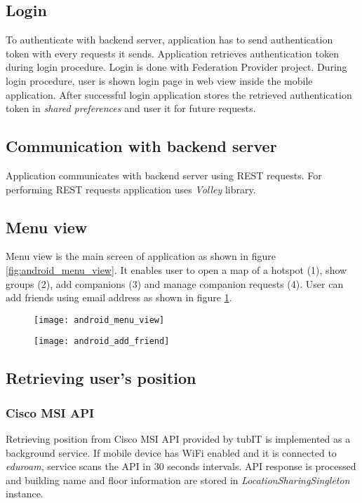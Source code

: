 \subsection{Login}
To authenticate with backend server, application has to send authentication token with every requests it sends. Application retrieves authentication token during login procedure. Login is done with Federation Provider project. During login procedure, user is shown login page in web view inside the mobile application. After successful login application stores the retrieved authentication token in \textit{shared preferences} and user it for future requests. 

\subsection{Communication with backend server}
Application communicates with backend server using REST requests. For performing REST requests application uses \textit{Volley} library.

\subsection{Menu view}
Menu view is the main screen of application as shown in figure \ref{fig:android_menu_view}. It enables user to open a map of a hotspot (1), show groups (2), add companions (3) and manage companion requests (4). User can add friends using email address as shown in figure \ref{fig:android_add_friend}.

\begin{figure}
\centering
\begin{minipage}{.5\textwidth}
  \centering
  \texttt{[image: android\_menu\_view]}
  \label{fig:android_menu_view}
\end{minipage}%
\begin{minipage}{.5\textwidth}
  \centering
  \texttt{[image: android\_add\_friend]}
  \label{fig:android_add_friend}
\end{minipage}
\end{figure}

\subsection{Retrieving user's position}
\subsubsection{Cisco MSI API}
Retrieving position from Cisco MSI API provided by tubIT is implemented as a background service. If mobile device has WiFi enabled and it is connected to \textit{eduroam}, service scans the API in 30 seconds intervals. API response is processed and building name and floor information are stored in \textit{LocationSharingSingleton} instance.

